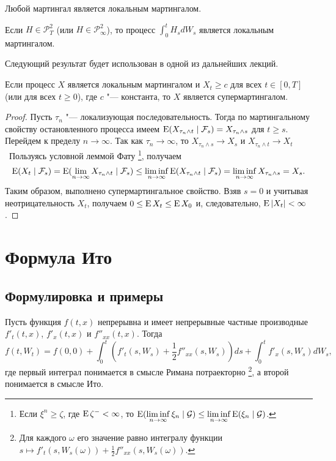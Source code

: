 \begin{remark}
Любой мартингал является локальным мартингалом.
\end{remark}

\begin{proposition}
Если $H \in \mathcal{P}^2_T$ (или $H \in \mathcal{P}^2_\infty$), то процесс $\int_0^t H_s dW_s$ является локальным мартингалом.
\end{proposition}

Следующий результат будет использован в одной из дальнейших лекций.

\begin{proposition}
Если процесс $X$ является локальным мартингалом и $X_t\ge c$ для всех $t\in[0,T]$ (или для всех $t\ge 0$), где $c$ "--- константа, то $X$ является супермартингалом.
\end{proposition}

\begin{proof}
Пусть $\tau_n$ "--- локализующая последовательность.
Тогда по мартингальному свойству остановленного процесса имеем $\operatorname{E} (X_{\tau_n\wedge t} \mid \mathcal{F}_s) = X_{\tau_n\wedge s}$ для $t\ge s$.
Перейдем к пределу $n\to\infty$. Так как $\tau_n\to\infty$, то $X_{\tau_n\wedge s} \to X_s$ и $X_{\tau_n\wedge t} \to X_t$ \as\ 
Пользуясь условной леммой Фату%
\footnote{Если $\xi^n\ge \zeta$, где $\operatorname{E}\zeta^- < \infty$, то $\operatorname{E} (\liminf\limits_{n\to\infty} \xi_n \mid \mathcal{G}) \le \liminf\limits_{n\to\infty} \operatorname{E}(\xi_n \mid \mathcal{G})$.},
получаем
\[
\operatorname{E} (X_t \mid \mathcal{F}_s) = \operatorname{E}(\lim\limits_{n\to\infty} X_{\tau_n\wedge t} \mid \mathcal{F}_s) \le \liminf_{n\to\infty} \operatorname{E}(X_{\tau_n\wedge t} \mid \mathcal{F}_s) = \liminf_{n\to\infty} X_{\tau_n\wedge s} = X_s.
\]
Таким образом, выполнено супермартингальное свойство.
Взяв $s=0$ и учитывая неотрицательность $X_t$, получаем $0 \le \operatorname{E} X_t \le \operatorname{E} X_0$ и, следовательно, $\operatorname{E}|X_t| < \infty$.
\end{proof}


\section{Формула Ито}
\subsection{Формулировка и примеры}

\begin{theorem}
Пусть функция $f(t,x)$ непрерывна и имеет непрерывные частные производные $f'_t(t,x)$, $f'_x(t,x)$ и $f''_{xx}(t,x)$. Тогда
\[
f(t, W_t) = f(0,0) + \int_0^t \left(f'_t(s,W_s) + \frac12 f''_{xx}(s,W_s)\right) ds + \int_0^t f'_x(s,W_s) dW_s,
\]
где первый интеграл понимается в смысле Римана потраекторно%
\footnote{Для каждого $\omega$ его значение равно интегралу функции $s\mapsto f'_t(s,W_s(\omega)) + \frac12 f''_{xx}(s,W_s(\omega))$.},
а второй понимается в смысле Ито.
\end{theorem}

